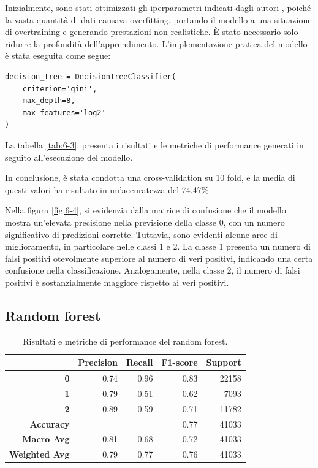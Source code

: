 Inizialmente, sono stati ottimizzati gli iperparametri indicati dagli autori \cite{iqbal2022exploring}, poiché la vasta quantità di dati causava overfitting, portando il modello a una situazione di overtraining e generando prestazioni non realistiche. È stato necessario solo ridurre la profondità dell'apprendimento. L'implementazione pratica del modello è stata eseguita come segue:

\bigskip

\begin{lstlisting}
decision_tree = DecisionTreeClassifier(
    criterion='gini',
    max_depth=8,
    max_features='log2'
)
\end{lstlisting}

\bigskip

La tabella \ref{tab:6-3}, presenta i risultati e le metriche di performance generati in seguito all'esecuzione del modello.

\bigskip

In conclusione, è stata condotta una cross-validation su 10 fold, e la media di questi valori ha risultato in un'accuratezza del 74.47\%.

\bigskip

Nella figura \ref{fig:6-4}, si evidenzia dalla matrice di confusione che il modello mostra un'elevata precisione nella previsione della classe 0, con un numero significativo di predizioni corrette. Tuttavia, sono evidenti alcune aree di miglioramento, in particolare nelle classi 1 e 2. La classe 1 presenta un numero di falsi positivi otevolmente superiore al numero di veri positivi, indicando una certa confusione nella classificazione. Analogamente, nella classe 2, il numero di falsi positivi è sostanzialmente maggiore rispetto ai veri positivi.

\subsection{Random forest}

\begin{table}[t]
    \centering
    \begin{tabular}{|r|rrrr|}
        \hline
        & \textbf{Precision}
        & \textbf{Recall}
        & \textbf{F1-score}
        & \textbf{Support} \\
        \hline
        \textbf{0}
        & 0.74
        & 0.96
        & 0.83
        & 22158 \\
        \textbf{1}
        & 0.79
        & 0.51
        & 0.62
        & 7093 \\
        \textbf{2}
        & 0.89
        & 0.59
        & 0.71
        & 11782 \\
        \textbf{Accuracy}
        &
        &
        & 0.77
        & 41033 \\
        \textbf{Macro Avg}
        & 0.81
        & 0.68
        & 0.72
        & 41033 \\
        \textbf{Weighted Avg}
        & 0.79
        & 0.77
        & 0.76
        & 41033 \\
        \hline
    \end{tabular}
    \caption{Risultati e metriche di performance del random forest.}
    \label{tab:6-4}
\end{table}

